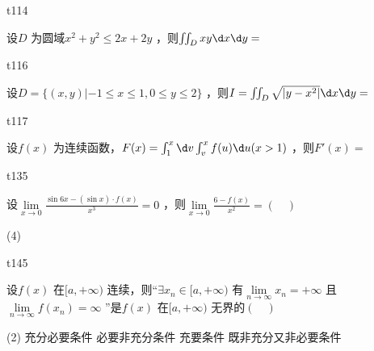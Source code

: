 \begin{question}
    t114

    设$ D $ 为圆域$ x^2 + y^2 \le 2x + 2y $ ，则$ \iint_D xy\d x \d y = $ 
\end{question}

\begin{question}
    t116

    设$ D = \{(x,y) | -1 \le x \le 1, 0 \le y \le 2\} $ ，则$ I = \iint_D \sqrt{\abs{y - x^2}} \d x\d y = $ 
\end{question}

\begin{question}
    t117

    设$ f(x) $ 为连续函数，$ F(x) = \int_{1}^{x} \d v \int_{v}^{x} f(u) \d u (x > 1) $ ，则$ F'(x) =  $ 
\end{question}

\begin{question}
    t135

    设$ \lim\limits_{x \to 0} \frac{\sin 6x - (\sin x)\cdot f(x)}{x^3} = 0 $ ，则$ \lim\limits_{x \to 0} \frac{6 - f(x)}{x^2} = (\quad) $
    \begin{tasks}(4)
        \task   \infty
    \end{tasks} 
\end{question}

\begin{question}
    t145

    设$ f(x) $ 在$ [a,+\infty) $ 连续，则“$ \exists x_n \in [a,+\infty) $ 有$ \lim\limits_{n \to \infty} x_n = +\infty $ 且$ \lim\limits_{n \to \infty} f(x_n) = \infty $ ”是$ f(x) $ 在$ [a,+\infty) $ 无界的$ (\quad) $ 
    \begin{tasks}(2)
        \task   充分必要条件
        \task   必要非充分条件
        \task   充要条件
        \task   既非充分又非必要条件
    \end{tasks}
\end{question}
